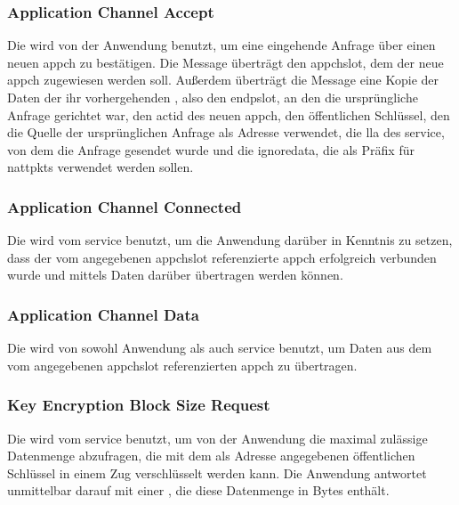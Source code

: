 \asprotoappchinreqbytefield


\subsubsection{Application Channel Accept}
\label{dcl-asproto-appchaccept}
Die \msg{\asprotoappchaccept} wird von der Anwendung benutzt, um eine eingehende
Anfrage über einen neuen \gls{appch} zu bestätigen.
Die Message überträgt den \gls{appchslot}, dem der neue \gls{appch} zugewiesen
werden soll. Außerdem überträgt die Message eine Kopie der Daten der ihr
vorhergehenden \msg{\asprotoappchinreq}, also den \gls{endpslot}, an den die
ursprüngliche Anfrage gerichtet war, den \gls{actid} des neuen \gls{appch},
den öffentlichen Schlüssel, den die Quelle der ursprünglichen Anfrage als
Adresse verwendet, die \gls{lla} des \gls{service}, von dem die Anfrage gesendet
wurde und die \gls{ignoredata}, die als Präfix für \glspl{nattpkt} verwendet
werden sollen.

\asprotoappchacceptbytefield


\subsubsection{Application Channel Connected}
\label{dcl-asproto-appchconnected}
Die \msg{\asprotoappchconnected} wird vom \gls{service} benutzt, um die
Anwendung darüber in Kenntnis zu setzen, dass der vom angegebenen
\gls{appchslot} referenzierte \gls{appch} erfolgreich verbunden wurde und
mittels \msg{\asprotoappchdata} Daten darüber übertragen werden können.

\asprotoappchconnectedbytefield


\subsubsection{Application Channel Data}
\label{dcl-asproto-appchdata}
Die \msg{\asprotoappchdata} wird von sowohl Anwendung als auch \gls{service}
benutzt, um Daten aus dem vom angegebenen \gls{appchslot} referenzierten
\gls{appch} zu übertragen.

\asprotoappchdatabytefield


\subsubsection{Key Encryption Block Size Request}
\label{dcl-asproto-keyencblocksizereq}
Die \msg{\asprotokeyencblocksizereq} wird vom \gls{service} benutzt, um von der
Anwendung die maximal zulässige Datenmenge abzufragen, die mit dem als Adresse
angegebenen öffentlichen Schlüssel in einem Zug verschlüsselt werden kann.
Die Anwendung antwortet unmittelbar darauf mit einer \msg{\asprotokeynum}, die
diese Datenmenge in Bytes enthält.

